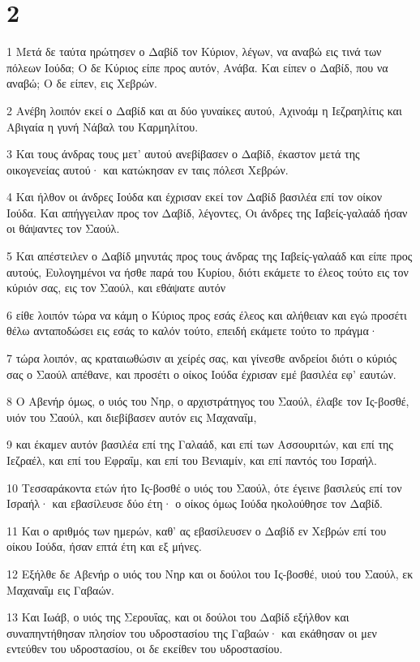 \chapter{2}

\par 1 Μετά δε ταύτα ηρώτησεν ο Δαβίδ τον Κύριον, λέγων, να αναβώ εις τινά των πόλεων Ιούδα; Ο δε Κύριος είπε προς αυτόν, Ανάβα. Και είπεν ο Δαβίδ, που να αναβώ; Ο δε είπεν, εις Χεβρών.
\par 2 Ανέβη λοιπόν εκεί ο Δαβίδ και αι δύο γυναίκες αυτού, Αχινοάμ η Ιεζραηλίτις και Αβιγαία η γυνή Νάβαλ του Καρμηλίτου.
\par 3 Και τους άνδρας τους μετ' αυτού ανεβίβασεν ο Δαβίδ, έκαστον μετά της οικογενείας αυτού· και κατώκησαν εν ταις πόλεσι Χεβρών.
\par 4 Και ήλθον οι άνδρες Ιούδα και έχρισαν εκεί τον Δαβίδ βασιλέα επί τον οίκον Ιούδα. Και απήγγειλαν προς τον Δαβίδ, λέγοντες, Οι άνδρες της Ιαβείς-γαλαάδ ήσαν οι θάψαντες τον Σαούλ.
\par 5 Και απέστειλεν ο Δαβίδ μηνυτάς προς τους άνδρας της Ιαβείς-γαλαάδ και είπε προς αυτούς, Ευλογημένοι να ήσθε παρά του Κυρίου, διότι εκάμετε το έλεος τούτο εις τον κύριόν σας, εις τον Σαούλ, και εθάψατε αυτόν
\par 6 είθε λοιπόν τώρα να κάμη ο Κύριος προς εσάς έλεος και αλήθειαν και εγώ προσέτι θέλω ανταποδώσει εις εσάς το καλόν τούτο, επειδή εκάμετε τούτο το πράγμα·
\par 7 τώρα λοιπόν, ας κραταιωθώσιν αι χείρές σας, και γίνεσθε ανδρείοι διότι ο κύριός σας ο Σαούλ απέθανε, και προσέτι ο οίκος Ιούδα έχρισαν εμέ βασιλέα εφ' εαυτών.
\par 8 Ο Αβενήρ όμως, ο υιός του Νηρ, ο αρχιστράτηγος του Σαούλ, έλαβε τον Ις-βοσθέ, υιόν του Σαούλ, και διεβίβασεν αυτόν εις Μαχαναΐμ,
\par 9 και έκαμεν αυτόν βασιλέα επί της Γαλαάδ, και επί των Ασσουριτών, και επί της Ιεζραέλ, και επί του Εφραΐμ, και επί του Βενιαμίν, και επί παντός του Ισραήλ.
\par 10 Τεσσαράκοντα ετών ήτο Ις-βοσθέ ο υιός του Σαούλ, ότε έγεινε βασιλεύς επί τον Ισραήλ· και εβασίλευσε δύο έτη· ο οίκος όμως Ιούδα ηκολούθησε τον Δαβίδ.
\par 11 Και ο αριθμός των ημερών, καθ' ας εβασίλευσεν ο Δαβίδ εν Χεβρών επί του οίκου Ιούδα, ήσαν επτά έτη και εξ μήνες.
\par 12 Εξήλθε δε Αβενήρ ο υιός του Νηρ και οι δούλοι του Ις-βοσθέ, υιού του Σαούλ, εκ Μαχαναΐμ εις Γαβαών.
\par 13 Και Ιωάβ, ο υιός της Σερουΐας, και οι δούλοι του Δαβίδ εξήλθον και συναπηντήθησαν πλησίον του υδροστασίου της Γαβαών· και εκάθησαν οι μεν εντεύθεν του υδροστασίου, οι δε εκείθεν του υδροστασίου.

